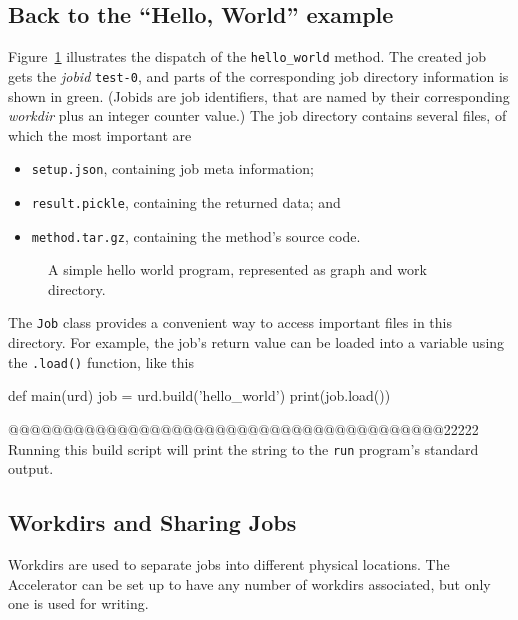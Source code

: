 \subsection{Back to the ``Hello, World'' example}
Figure~\ref{fig:execflow-hello-world} illustrates the dispatch of the
\texttt{hello\_world} method.  The created job gets the \textsl{jobid}
\texttt{test-0}, and parts of the corresponding job directory
information is shown in green.  (Jobids are job identifiers, that are
named by their corresponding \textsl{workdir} plus an integer counter
value.)  The job directory contains several files, of which the most
important are
\begin{itemize}
\item[] \texttt{setup.json}, containing job meta information;
\item[] \texttt{result.pickle}, containing the returned data; and
\item[] \texttt{method.tar.gz}, containing the method's source code.
\end{itemize}

\begin{figure}[h!]
  \begin{center}
    
    \caption{A simple hello world program, represented as graph and
      work directory.}
    \label{fig:execflow-hello-world}
  \end{center}
\end{figure}

The \texttt{Job} class provides a convenient way to access important
files in this directory.  For example, the job's return value can be
loaded into a variable using the \texttt{.load()} function, like this
\begin{python}
def main(urd)
    job = urd.build('hello_world')
    print(job.load())
\end{python}
@@@@@@@@@@@@@@@@@@@@@@@@@@@@@@@@@@@@@@@@22222
Running this build script will print the string to the \texttt{run}
program's standard output.



\subsection{Workdirs and Sharing Jobs}

Workdirs are used to separate jobs into different physical locations.
The Accelerator can be set up to have any number of workdirs
associated, but only one is used for writing.

